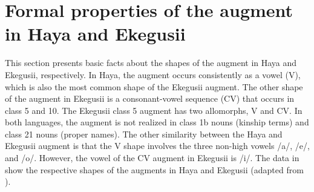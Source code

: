 \documentclass[output=paper]{langscibook}
\begin{document}
\section{Formal properties of the augment in Haya and Ekegusii} \label{sec:choti:3}
This section presents basic facts about the shapes of the augment in Haya and Ekegusii, respectively. In Haya, the augment occurs consistently as a vowel (V), which is also the most common shape of the Ekegusii augment. The other shape of the augment in Ekegusii is a consonant-vowel sequence (CV) that occurs in class 5 and 10.  The Ekegusii class 5 augment has two allomorphs, V and CV. In both languages, the augment is not realized in class 1b nouns (kinship terms) and class 21 nouns (proper names). The other similarity between the Haya and Ekegusii augment is that the V shape involves the three non-high vowels /a/, /e/, and /o/. However, the vowel of the CV augment in Ekegusii is /i/.  The data in  show the respective shapes of the augments in Haya \citep[35]{chagas1977} and Ekegusii (adapted from \citealt[199]{cammenga2002phonology}).
\end{document}
